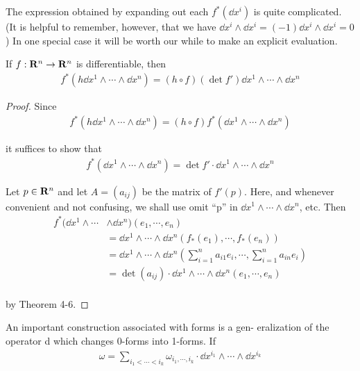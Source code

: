 The expression obtained by expanding out each $f^*(\dd x^i)$ is quite
complicated. (It is helpful to remember, however, that we have 
$\dd x^i\wedge\dd x^i = (-1)\dd x^i\wedge\dd x^i = 0$)
In one special case it will be worth our while to make an explicit evaluation.

\begin{theorem}
    If $f:\mathbf{R}^n\to \mathbf{R}^n$ is differentiable, then 
    \begin{align*}
        f^*(h\dd x^1 \wedge \cdots \wedge \dd x^n) 
        = 
        (h\circ f)(\det f') \dd x^1\wedge \cdots \wedge \dd x^n
    \end{align*}
\end{theorem}

\begin{proof}
    Since 
    \begin{align*}
        f^*(h\dd x^1\wedge\cdots\wedge\dd x^n) 
        = (h\circ f)f^*(\dd x^1\wedge\cdots\wedge \dd x^n)
    \end{align*}

    it suffices to show that 
    \begin{align*}
        f^*(\dd x^1\wedge\cdots\wedge\dd x^n) = \det f'\cdot \dd x^1\wedge\cdots\wedge\dd x^n
    \end{align*}

    Let $p\in \mathbf{R}^n$ and let $A=(a_{ij})$ be the matrix of $f'(p)$. Here, and whenever 
    convenient and not confusing, we shall use omit ``p'' in $\dd x^1\wedge\cdots\wedge\dd x^n$, etc.
    Then 
    \begin{align*}
        f^*(\dd x^1\wedge\cdots & \wedge\dd x^n)(e_1, \cdots, e_n)\\
        & = \dd x^1\wedge \cdots \wedge \dd x^n (f_*(e_1), \cdots, f_*(e_n)) \\
        & = \dd x^1\wedge \cdots \wedge \dd x^n \left(\sum_{i=1}^{n}a_{i1}e_i, \cdots, \sum_{i=1}^{n}a_{in}e_i\right) \\
        & = \det(a_{ij})\cdot \dd x^1\wedge \cdots \wedge \dd x^n(e_1, \cdots, e_n) \\
    \end{align*}

    by Theorem 4-6.
\end{proof}

An important construction associated with forms is a gen-
eralization of the operator d which changes 0-forms into
1-forms. If 
\begin{align*}
    \omega = \sum_{i_1<\cdots<i_k}^{}{\omega_{i_1,\cdots,i_k}\cdot \dd x^{i_1}\wedge\cdots\wedge\dd x^{i_k}}
\end{align*}

